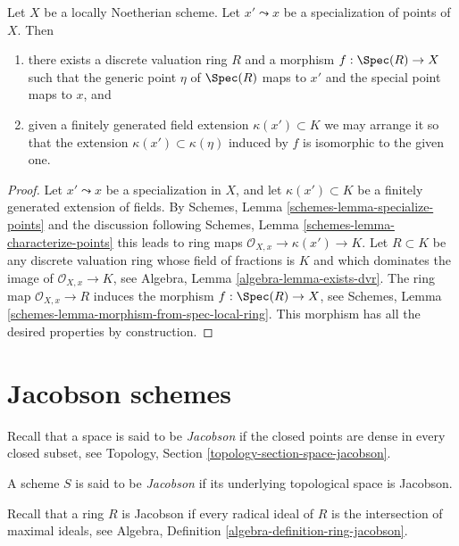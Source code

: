 \begin{lemma}
\label{lemma-locally-Noetherian-specialization-dvr}
Let $X$ be a locally Noetherian scheme.
Let $x' \leadsto x$ be a specialization of points of $X$.
Then
\begin{enumerate}
\item there exists a discrete valuation ring $R$ and a morphism
$f : \Spec(R) \to X$ such that the generic point $\eta$ of
$\Spec(R)$ maps to $x'$ and the special point maps to $x$, and
\item given a finitely generated field extension $\kappa(x') \subset K$
we may arrange it so that the extension $\kappa(x') \subset \kappa(\eta)$
induced by $f$ is isomorphic to the given one.
\end{enumerate}
\end{lemma}

\begin{proof}
Let $x' \leadsto x$ be a specialization in $X$, and let
$\kappa(x') \subset K$ be a finitely generated extension of fields. By
Schemes, Lemma \ref{schemes-lemma-specialize-points}
and the discussion following
Schemes, Lemma \ref{schemes-lemma-characterize-points}
this leads to ring maps $\mathcal{O}_{X, x} \to \kappa(x') \to K$.
Let $R \subset K$ be any discrete valuation ring whose field of fractions is
$K$ and which dominates the image of $\mathcal{O}_{X, x} \to K$, see
Algebra, Lemma \ref{algebra-lemma-exists-dvr}.
The ring map $\mathcal{O}_{X, x} \to R$ induces the morphism
$f : \Spec(R) \to X$, see
Schemes, Lemma \ref{schemes-lemma-morphism-from-spec-local-ring}.
This morphism has all the desired properties by construction.
\end{proof}




\section{Jacobson schemes}
\label{section-jacobson}

\noindent
Recall that a space is said to be {\it Jacobson} if the closed points are
dense in every closed subset, see
Topology, Section \ref{topology-section-space-jacobson}.

\begin{definition}
\label{definition-jacobson}
A scheme $S$ is said to be {\it Jacobson} if its underlying topological
space is Jacobson.
\end{definition}

\noindent
Recall that a ring $R$ is Jacobson if every radical ideal of $R$
is the intersection of maximal ideals, see
Algebra, Definition \ref{algebra-definition-ring-jacobson}.

